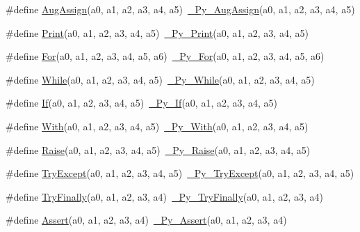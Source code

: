 \begin{DoxyCompactItemize}
\item 
\#define \mbox{\hyperlink{_python-ast_8h_aab09467214841c326f3c20477e9c31af}{Aug\+Assign}}(a0,  a1,  a2,  a3,  a4,  a5)~\mbox{\hyperlink{_python-ast_8h_aa5441b53bbc02068d0348142c67109fa}{\+\_\+\+Py\+\_\+\+Aug\+Assign}}(a0, a1, a2, a3, a4, a5)
\item 
\#define \mbox{\hyperlink{_python-ast_8h_a6e4d6b1145275e9c1d89c9aa5b778546}{Print}}(a0,  a1,  a2,  a3,  a4,  a5)~\mbox{\hyperlink{_python-ast_8h_ab5588d69d529b0cf9ef93fe25435f521}{\+\_\+\+Py\+\_\+\+Print}}(a0, a1, a2, a3, a4, a5)
\item 
\#define \mbox{\hyperlink{_python-ast_8h_a8392a32b4f002d4b372598185b549a1d}{For}}(a0,  a1,  a2,  a3,  a4,  a5,  a6)~\mbox{\hyperlink{_python-ast_8h_a53baf77d5304f3cbae00f4a06e5f1731}{\+\_\+\+Py\+\_\+\+For}}(a0, a1, a2, a3, a4, a5, a6)
\item 
\#define \mbox{\hyperlink{_python-ast_8h_ae39ca9133484f2b999cbe74d93635d96}{While}}(a0,  a1,  a2,  a3,  a4,  a5)~\mbox{\hyperlink{_python-ast_8h_a95968d26701a57ae6bb604224b74ecee}{\+\_\+\+Py\+\_\+\+While}}(a0, a1, a2, a3, a4, a5)
\item 
\#define \mbox{\hyperlink{_python-ast_8h_a3caa32cf8ff8db15e5835f5e40e6c6f8}{If}}(a0,  a1,  a2,  a3,  a4,  a5)~\mbox{\hyperlink{_python-ast_8h_a4576b4b5b479fe67421c45bc1fcab077}{\+\_\+\+Py\+\_\+\+If}}(a0, a1, a2, a3, a4, a5)
\item 
\#define \mbox{\hyperlink{_python-ast_8h_a0ef7ddc3b9bcb5c59195acbe024e3938}{With}}(a0,  a1,  a2,  a3,  a4,  a5)~\mbox{\hyperlink{_python-ast_8h_abd123e9dd4c50b67b73c8f676ff74315}{\+\_\+\+Py\+\_\+\+With}}(a0, a1, a2, a3, a4, a5)
\item 
\#define \mbox{\hyperlink{_python-ast_8h_a848cb93d9dbab05992a08c7e6b50fc74}{Raise}}(a0,  a1,  a2,  a3,  a4,  a5)~\mbox{\hyperlink{_python-ast_8h_adfc8c2a87f1fe7625435a22b28d1fc7f}{\+\_\+\+Py\+\_\+\+Raise}}(a0, a1, a2, a3, a4, a5)
\item 
\#define \mbox{\hyperlink{_python-ast_8h_a88c347936a7d01ec132bdc2411ad5ba5}{Try\+Except}}(a0,  a1,  a2,  a3,  a4,  a5)~\mbox{\hyperlink{_python-ast_8h_ae5f1aab66bb67790df6acd7da5c88846}{\+\_\+\+Py\+\_\+\+Try\+Except}}(a0, a1, a2, a3, a4, a5)
\item 
\#define \mbox{\hyperlink{_python-ast_8h_a72f1c5def10d26a6fd8c0d19dcdd4b08}{Try\+Finally}}(a0,  a1,  a2,  a3,  a4)~\mbox{\hyperlink{_python-ast_8h_acb1710941c4c76ee877ee4135ced2b96}{\+\_\+\+Py\+\_\+\+Try\+Finally}}(a0, a1, a2, a3, a4)
\item 
\#define \mbox{\hyperlink{_python-ast_8h_ac2a76bd57d9607fccd7bbc0f40255d13}{Assert}}(a0,  a1,  a2,  a3,  a4)~\mbox{\hyperlink{_python-ast_8h_a49ca293b711e4c7548184670d3e4e17f}{\+\_\+\+Py\+\_\+\+Assert}}(a0, a1, a2, a3, a4)

\end{DoxyCompactItemize}
